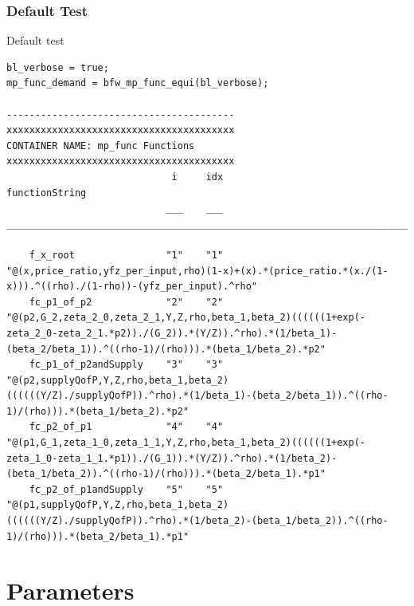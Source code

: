 \documentclass[
]{book}
\begin{document}
\hypertarget{default-test-1}{%
\subsection{Default Test}\label{default-test-1}}

Default test

\begin{verbatim}
bl_verbose = true;
mp_func_demand = bfw_mp_func_equi(bl_verbose);

----------------------------------------
xxxxxxxxxxxxxxxxxxxxxxxxxxxxxxxxxxxxxxxx
CONTAINER NAME: mp_func Functions
xxxxxxxxxxxxxxxxxxxxxxxxxxxxxxxxxxxxxxxx
                             i     idx                                                                                     functionString                                                                                  
                            ___    ___    _________________________________________________________________________________________________________________________________________________________________________________

    f_x_root                "1"    "1"    "@(x,price_ratio,yfz_per_input,rho)(1-x)+(x).*(price_ratio.*(x./(1-x))).^((rho)./(1-rho))-(yfz_per_input).^rho"                                                                  
    fc_p1_of_p2             "2"    "2"    "@(p2,G_2,zeta_2_0,zeta_2_1,Y,Z,rho,beta_1,beta_2)((((((1+exp(-zeta_2_0-zeta_2_1.*p2))./(G_2)).*(Y/Z)).^rho).*(1/beta_1)-(beta_2/beta_1)).^((rho-1)/(rho))).*(beta_1/beta_2).*p2"
    fc_p1_of_p2andSupply    "3"    "3"    "@(p2,supplyQofP,Y,Z,rho,beta_1,beta_2)((((((Y/Z)./supplyQofP)).^rho).*(1/beta_1)-(beta_2/beta_1)).^((rho-1)/(rho))).*(beta_1/beta_2).*p2"                                       
    fc_p2_of_p1             "4"    "4"    "@(p1,G_1,zeta_1_0,zeta_1_1,Y,Z,rho,beta_1,beta_2)((((((1+exp(-zeta_1_0-zeta_1_1.*p1))./(G_1)).*(Y/Z)).^rho).*(1/beta_2)-(beta_1/beta_2)).^((rho-1)/(rho))).*(beta_2/beta_1).*p1"
    fc_p2_of_p1andSupply    "5"    "5"    "@(p1,supplyQofP,Y,Z,rho,beta_1,beta_2)((((((Y/Z)./supplyQofP)).^rho).*(1/beta_2)-(beta_1/beta_2)).^((rho-1)/(rho))).*(beta_2/beta_1).*p1"                                       
\end{verbatim}

\hypertarget{parameters}{%
\chapter{Parameters}\label{parameters}}
\end{document}
